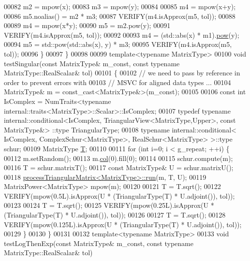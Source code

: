 \begin{DoxyCode}
00082     m2 = mpow(x);
00083     m3 = mpow(y);
00084 
00085     m4 = mpow(x+y);
00086     m5.noalias() = m2 * m3;
00087     VERIFY(m4.isApprox(m5, tol));
00088 
00089     m4 = mpow(x*y);
00090     m5 = m2.pow(y);
00091     VERIFY(m4.isApprox(m5, tol));
00092 
00093     m4 = (std::abs(x) * m1).\hyperlink{group___core___module_ab6dc101d82e8228a19a8840e3a29c1c9}{pow}(y);
00094     m5 = std::pow(std::abs(x), y) * m3;
00095     VERIFY(m4.isApprox(m5, tol));
00096   \}
00097 \}
00098 
00099 \textcolor{keyword}{template}<\textcolor{keyword}{typename} MatrixType>
00100 \textcolor{keywordtype}{void} testSingular(\textcolor{keyword}{const} MatrixType& m\_const, \textcolor{keyword}{const} \textcolor{keyword}{typename} MatrixType::RealScalar& tol)
00101 \{
00102   \textcolor{comment}{// we need to pass by reference in order to prevent errors with}
00103   \textcolor{comment}{// MSVC for aligned data types ...}
00104   MatrixType& m = \textcolor{keyword}{const\_cast<}MatrixType&\textcolor{keyword}{>}(m\_const);
00105 
00106   \textcolor{keyword}{const} \textcolor{keywordtype}{int} IsComplex = NumTraits<typename internal::traits<MatrixType>::Scalar>::IsComplex;
00107   \textcolor{keyword}{typedef} \textcolor{keyword}{typename} internal::conditional<IsComplex, TriangularView<MatrixType,Upper>, \textcolor{keyword}{const} MatrixType&>
      ::type TriangularType;
00108   \textcolor{keyword}{typename} internal::conditional< IsComplex, ComplexSchur<MatrixType>, RealSchur<MatrixType> >::type schur;
00109   MatrixType \hyperlink{group___sparse_core___module_class_eigen_1_1_triplet}{T};
00110 
00111   \textcolor{keywordflow}{for} (\textcolor{keywordtype}{int} i=0; i < g\_repeat; ++i) \{
00112     m.setRandom();
00113     m.\hyperlink{group___sparse_core___module_a3531e3e2098507a069a368d72d46471e}{col}(0).fill(0);
00114 
00115     schur.compute(m);
00116     T = schur.matrixT();
00117     \textcolor{keyword}{const} MatrixType& U = schur.matrixU();
00118     \hyperlink{structprocess_triangular_matrix}{processTriangularMatrix<MatrixType>::run}(m, T, U);
00119     MatrixPower<MatrixType> mpow(m);
00120 
00121     T = T.sqrt();
00122     VERIFY(mpow(0.5L).isApprox(U * (TriangularType(T) * U.adjoint()), tol));
00123 
00124     T = T.sqrt();
00125     VERIFY(mpow(0.25L).isApprox(U * (TriangularType(T) * U.adjoint()), tol));
00126 
00127     T = T.sqrt();
00128     VERIFY(mpow(0.125L).isApprox(U * (TriangularType(T) * U.adjoint()), tol));
00129   \}
00130 \}
00131 
00132 \textcolor{keyword}{template}<\textcolor{keyword}{typename} MatrixType>
00133 \textcolor{keywordtype}{void} testLogThenExp(\textcolor{keyword}{const} MatrixType& m\_const, \textcolor{keyword}{const} \textcolor{keyword}{typename} MatrixType::RealScalar& tol)

\end{DoxyCode}
